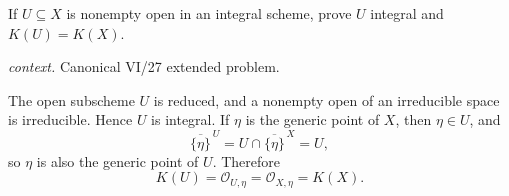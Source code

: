 \begin{problem}\label{prob:vi27-p06}
If \(U\subseteq X\) is nonempty open in an integral scheme, prove \(U\) integral and \(K(U)=K(X)\).
\par\smallskip\noindent\textit{context.} Canonical VI/27 extended problem.
\end{problem}

\ifdefined\FullProblemDossiers
\begin{solution}
The open subscheme \(U\) is reduced, and a nonempty open of an irreducible space is irreducible. Hence \(U\)
is integral. If \(\eta\) is the generic point of \(X\), then \(\eta\in U\), and
\[
\overline{\{\eta\}}^{\,U}=U\cap\overline{\{\eta\}}^{\,X}=U,
\]
so \(\eta\) is also the generic point of \(U\). Therefore
\[
K(U)=\mathcal O_{U,\eta}=\mathcal O_{X,\eta}=K(X).
\]
\end{solution}
\fi
